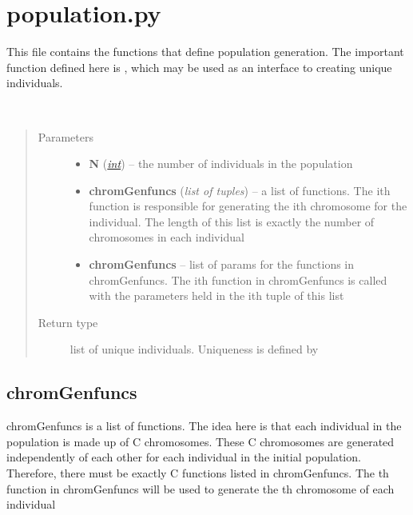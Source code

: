 \documentclass[letterpaper,10pt,english]{sphinxmanual}
\begin{document}
\section{population.py}
\label{Overview:population-py}
This file contains the functions that define population generation.
The important function defined here is {\hyperref[Overview:genPop]{}}, which may be used as an interface to creating unique individuals.

\begin{fulllineitems}
\label{Overview:genPop}~\begin{quote}\begin{description}
\item[{Parameters}] \leavevmode\begin{itemize}
\item {} 
\textbf{N} (\href{http://docs.python.org/library/functions.html\#int}{\emph{int}}) -- the number of individuals in the population

\item {} 
\textbf{chromGenfuncs} (\emph{list of tuples}) -- a list of functions. The ith function is responsible for generating the ith chromosome for the individual. The length of this list is exactly the number of chromosomes in each individual

\item {} 
\textbf{chromGenfuncs} -- list of params for the functions in chromGenfuncs. The ith function in chromGenfuncs is called with the parameters held in the ith tuple of this list

\end{itemize}

\item[{Return type}] \leavevmode
list of unique individuals. Uniqueness is defined by 

\end{description}\end{quote}

\end{fulllineitems}



\subsection{chromGenfuncs}
\label{Overview:chromgenfuncs}
chromGenfuncs is a list of functions. The idea here is that each individual in the population is made up of C chromosomes. These C chromosomes are generated independently of each other for each individual in the initial population. Therefore, there must be exactly C functions listed in chromGenfuncs. The  th function in chromGenfuncs will be used to generate the  th chromosome of each individual
\end{document}

